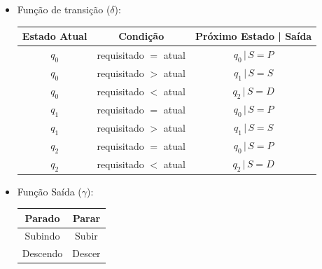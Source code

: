         \begin{itemize}
            \item Função de transição ($\delta$):
                \begin{center}
                    \begin{tabular}{|c|c|c|}
                        \hline
                        Estado Atual & Condição & Próximo Estado | Saída \\
                        \hline
                        $q_0$ & requisitado $=$ atual & $q_0 \,|\, S = P$ \\
                        $q_0$ & requisitado $>$ atual & $q_1 \,|\, S = S$ \\
                        $q_0$ & requisitado $<$ atual & $q_2 \,|\, S = D$ \\
                        \hline
                        $q_1$ & requisitado $=$ atual & $q_0 \,|\, S = P$ \\
                        $q_1$ & requisitado $>$ atual & $q_1 \,|\, S = S$ \\
                        \hline
                        $q_2$ & requisitado $=$ atual & $q_0 \,|\, S = P$ \\
                        $q_2$ & requisitado $<$ atual & $q_2 \,|\, S = D$ \\
                        \hline  
                    \end{tabular}
                \end{center}
                
            \item Função Saída ($\gamma$):
            \begin{center}
                \begin{tabular}{|c|c|}
                    \hline
                    Parado & Parar\\
                    \hline
                    Subindo & Subir\\
                    \hline
                    Descendo & Descer\\
                    \hline
                \end{tabular}
            \end{center}
        \end{itemize}
